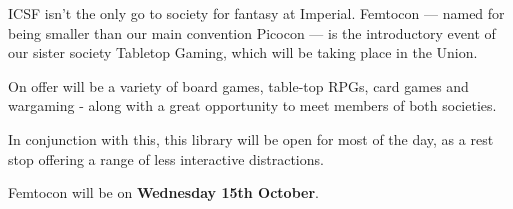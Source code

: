 ICSF isn't the only go to society for fantasy at Imperial.
Femtocon --- named for being smaller than our main convention Picocon ---
is the introductory event of our sister society Tabletop Gaming, which will
be taking place in the Union.

On offer will be a variety of board games, table-top RPGs, card games
and wargaming - along with a great opportunity to meet members of both
societies.

In conjunction with this, this library will be open for most of the day, as a
rest stop offering a range of less interactive distractions.

Femtocon will be on \textbf{Wednesday 15th October}.

